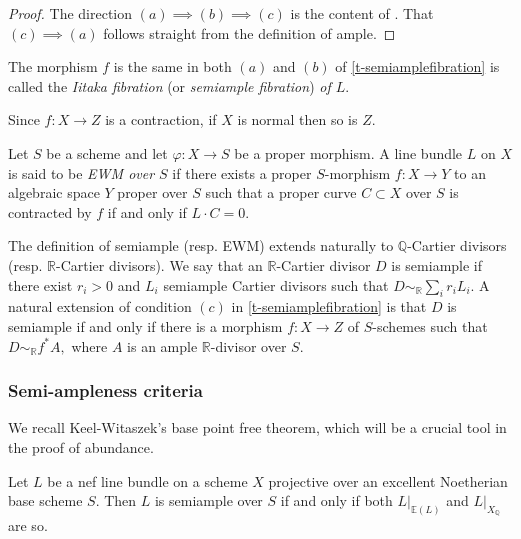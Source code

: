 	\begin{proof}
		The direction $(a) \implies (b) \implies (c)$ is the content of \cite[Theorem 2.1.26]{La1}. That $(c) \implies (a)$ follows straight from the definition of ample.
	\end{proof}
	
	The morphism $f$ is the same in both $(a)$ and $(b)$ of \autoref{t-semiamplefibration} is called the \textit{Iitaka fibration} (or \textit{semiample fibration}) \textit{of $L$}. 
	
	\begin{remark}
		Since $f \colon X \to Z$ is a contraction, if $X$ is normal then so is $Z$.
	\end{remark}
	
	\begin{definition}
		Let $S$ be a scheme and let $\varphi \colon X \to S$ be a proper morphism. A line bundle $L$ on $X$ is said to be \emph{EWM over $S$} if there
		exists a proper $S$-morphism $f \colon X \rightarrow Y $ to an algebraic space $Y$ proper over $S$ such that a proper curve $C \subset X$ over $S$ is contracted by $f$ if and only if
		$L \cdot C = 0$.
	\end{definition}
	
	The definition of semiample (resp. EWM) extends naturally to $\mathbb{Q}$-Cartier divisors (resp. $\mathbb{R}$-Cartier divisors).
	We say that an $\mathbb{R}$-Cartier divisor $D$ is semiample if there exist $r_i>0$ and $L_i$ semiample Cartier divisors such that $D \sim_{\mathbb{R}}\sum_i r_{i}L_{i}$. A natural extension of condition $(c)$ in \autoref{t-semiamplefibration} is that $D$ is semiample if and only if there is a morphism $f \colon X \to Z$ of $S$-schemes such that $D\sim_{\mathbb{R}} f^*A,$ where $A$ is an ample $\mathbb{R}$-divisor over $S$.
	
	\subsubsection{Semi-ampleness criteria}
	
	We recall Keel-Witaszek's base point free theorem, which will be a crucial tool in the proof of abundance.
	
	\begin{theorem}
		Let $L$ be a nef line bundle on a scheme $X$
		projective over an excellent Noetherian base scheme $S$. Then $L$ is semiample over $S$ if and only if both $L|_{\mathbb{E}(L)}$ and $L|_{X_{\mathbb{Q}}}$
		are so.
	\end{theorem}
	
